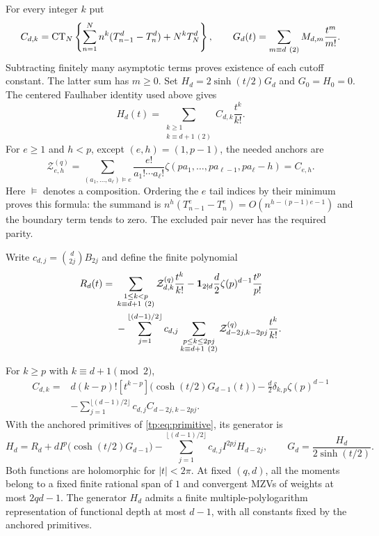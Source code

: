 For every integer $k$ put
\[
 C_{d,k}=\operatorname{CT}_N\left\{\sum_{n=1}^N n^k(T_{n-1}^d-T_n^d)
                                  +N^kT_N^d\right\},\qquad
 G_d(t)=\sum_{m\equiv d\ (2)}M_{d,m}\frac{t^m}{m!}.
\]
Subtracting finitely many asymptotic terms proves existence of each
cutoff constant. The latter sum has $m\geq0$.
Set $H_d=2\sinh(t/2)G_d$ and
$G_0=H_0=0$. The centered Faulhaber identity used above gives
\begin{equation}\label{et:HC}
 H_d(t)=\sum_{\substack{k\geq1\\k\equiv d+1\ (2)}}C_{d,k}\frac{t^k}{k!}.
\end{equation}
For $e\geq1$ and $h<p$, except $(e,h)=(1,p-1)$, the needed anchors are
\begin{equation}\label{et:anchors}
 \mathcal Z^{(q)}_{e,h}=
 \sum_{(a_1,\ldots,a_\ell)\vDash e}
 \frac{e!}{a_1!\cdots a_\ell!}
 \zeta(pa_1,\ldots,pa_{\ell-1},pa_\ell-h)=C_{e,h}.
\end{equation}
Here $\vDash$ denotes a composition. Ordering the $e$ tail indices
by their minimum proves this formula: the summand is
$n^h(T_{n-1}^e-T_n^e)=O(n^{h-(p-1)e-1})$ and the boundary term
tends to zero. The excluded pair never has the required parity.

Write $c_{d,j}=\binom d{2j}B_{2j}$ and define the finite polynomial
\begin{align}\label{et:R}
 R_d(t)={}&\sum_{\substack{1\leq k<p\\k\equiv d+1\ (2)}}
       \mathcal Z^{(q)}_{d,k}\frac{t^k}{k!}
 -\mathbf1_{2\nmid d}\frac d2\zeta(p)^{d-1}\frac{t^p}{p!}\notag\\
 &-\sum_{j=1}^{\lfloor(d-1)/2\rfloor}c_{d,j}
   \sum_{\substack{p\leq k\leq2pj\\k\equiv d+1\ (2)}}
       \mathcal Z^{(q)}_{d-2j,k-2pj}\frac{t^k}{k!}.
\end{align}

\begin{theorem}\label{et:main}
For $k\geq p$ with $k\equiv d+1\pmod2$,
\begin{equation}\label{et:recurrence}
 \begin{split}
 C_{d,k}={}&d(k-p)![t^{k-p}]\bigl(\cosh(t/2)G_{d-1}(t)\bigr)
       -\frac d2\delta_{k,p}\zeta(p)^{d-1}\\
 &-\sum_{j=1}^{\lfloor(d-1)/2\rfloor}c_{d,j}C_{d-2j,k-2pj}.
 \end{split}
\end{equation}
With the anchored primitives of \eqref{tp:eq:primitive}, its generator is
\begin{equation}\label{et:generator}
 H_d=R_d+dI^p\bigl(\cosh(t/2)G_{d-1}\bigr)
        -\sum_{j=1}^{\lfloor(d-1)/2\rfloor}c_{d,j}I^{2pj}H_{d-2j},
 \qquad G_d=\frac{H_d}{2\sinh(t/2)}.
\end{equation}
Both functions are holomorphic for $|t|<2\pi$. At fixed $(q,d)$,
all the moments belong to a fixed finite rational span of $1$ and
convergent MZVs of weights at most $2qd-1$. The generator $H_d$ admits
a finite multiple-polylogarithm representation of functional depth at
most $d-1$, with all constants fixed by the anchored primitives.
\end{theorem}

